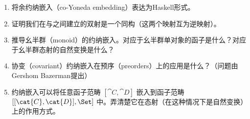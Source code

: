 \begin{enumerate}
  \tightlist
  \item
        将余约纳嵌入（co-Yoneda embedding）表达为Haskell形式。
  \item
        证明我们在与之间建立的双射是一个同构（这两个映射互为逆映射）。
  \item
        推导幺半群（monoid）的约纳嵌入。对应于幺半群单对象的函子是什么？对应于幺半群态射的自然变换是什么？
  \item
        协变（covariant）约纳嵌入在预序（preorders）上的应用是什么？（问题由Gershom Bazerman提出）
  \item
        约纳嵌入可以将任意函子范畴 $[\cat{C}, \cat{D}]$ 嵌入到函子范畴 $[[\cat{C}, \cat{D}], \Set]$ 中。弄清楚它在态射（在这种情况下是自然变换）上的作用方式。
\end{enumerate}
